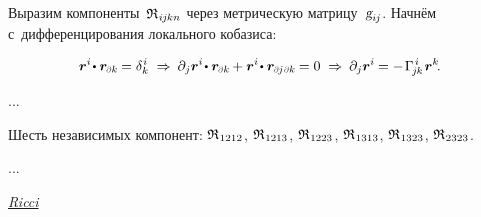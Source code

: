 \begin{otherlanguage}{russian}
Выразим компоненты~${\mathfrak{R}_{\hspace{.1ex}i\hspace{-0.1ex}j\hspace{-0.1ex}kn}}$ через метрическую матрицу~${\textsl{g}_{i\hspace{-0.1ex}j}}$.
Начнём с~дифференцирования локального кобазиса:

\[
\locationvector^i \hspace{-0.32ex} \dotp \locationvector_\differentialindex{k} \hspace{-0.16ex} = \delta_k^{\hspace{.1ex}i}
\;\Rightarrow\:
\partial_j \locationvector^i \hspace{-0.32ex} \dotp \locationvector_\differentialindex{k} \hspace{-0.15ex} + \locationvector^i \hspace{-0.32ex} \dotp \locationvector_{\differentialindex{\hspace{-0.1ex}j}\hspace{.2ex}\differentialindex{k}} \hspace{-0.15ex} = 0
\;\Rightarrow\:
\partial_j \locationvector^i \hspace{-0.12ex} = - \hspace{.2ex} \Gamma_{\hspace{-0.25ex}j\hspace{-0.1ex}k}^{\hspace{.25ex}i} \hspace{.2ex} \locationvector^k
\hspace{-0.4ex} .
\]

...

Шесть независимых компонент:
${\mathfrak{R}_{\hspace{.1ex}1212}}$, ${\mathfrak{R}_{\hspace{.1ex}1213}}$, ${\mathfrak{R}_{\hspace{.1ex}1223}}$, ${\mathfrak{R}_{\hspace{.1ex}1313}}$, ${\mathfrak{R}_{\hspace{.1ex}1323}}$, ${\mathfrak{R}_{\hspace{.1ex}2323}}$.

...

  \href{https://en.wikipedia.org/wiki/Ricci_curvature}{\emph{Ricci}}


\end{otherlanguage}
